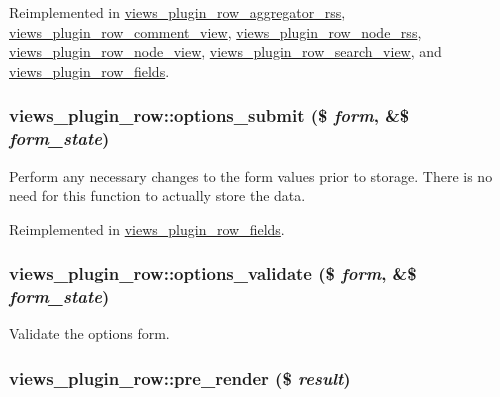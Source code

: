 Reimplemented in \hyperlink{classviews__plugin__row__aggregator__rss_a5c9bce3143901863f1a446b622fda9c}{views\_\-plugin\_\-row\_\-aggregator\_\-rss}, \hyperlink{classviews__plugin__row__comment__view_7dd276ec1a14a2d34f80a8020557608a}{views\_\-plugin\_\-row\_\-comment\_\-view}, \hyperlink{classviews__plugin__row__node__rss_074125b7562bb918124c2dae6322f58e}{views\_\-plugin\_\-row\_\-node\_\-rss}, \hyperlink{classviews__plugin__row__node__view_7bc31b38a1cc4474695af3a564fde775}{views\_\-plugin\_\-row\_\-node\_\-view}, \hyperlink{classviews__plugin__row__search__view_2d2e479f414c487aff3d88343274b49b}{views\_\-plugin\_\-row\_\-search\_\-view}, and \hyperlink{classviews__plugin__row__fields_bb87b6c98697fb676638759cb95072e3}{views\_\-plugin\_\-row\_\-fields}.\hypertarget{classviews__plugin__row_083534753b8e7e30d6d5b14d93f10bf4}{
\subsubsection[{options\_\-submit}]{\setlength{\rightskip}{0pt plus 5cm}views\_\-plugin\_\-row::options\_\-submit (\$ {\em form}, \/  \&\$ {\em form\_\-state})}}
\label{classviews__plugin__row_083534753b8e7e30d6d5b14d93f10bf4}


Perform any necessary changes to the form values prior to storage. There is no need for this function to actually store the data. 

Reimplemented in \hyperlink{classviews__plugin__row__fields_25748927a3375430946259f22c841620}{views\_\-plugin\_\-row\_\-fields}.\hypertarget{classviews__plugin__row_854979826451916d9b04517ad6e32840}{
\subsubsection[{options\_\-validate}]{\setlength{\rightskip}{0pt plus 5cm}views\_\-plugin\_\-row::options\_\-validate (\$ {\em form}, \/  \&\$ {\em form\_\-state})}}
\label{classviews__plugin__row_854979826451916d9b04517ad6e32840}


Validate the options form. \hypertarget{classviews__plugin__row_e49a23f750874e4b3d294aa3a20ecd64}{
\subsubsection[{pre\_\-render}]{\setlength{\rightskip}{0pt plus 5cm}views\_\-plugin\_\-row::pre\_\-render (\$ {\em result})}}
\label{classviews__plugin__row_e49a23f750874e4b3d294aa3a20ecd64}


